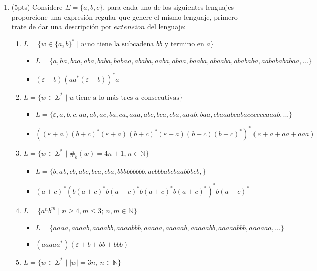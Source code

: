 \documentclass{article}
\begin{document}
\begin{enumerate}
    \item (5pts) Considere $\Sigma = \{a, b, c\}$, para cada uno de los siguientes lenguajes proporcione una expresión regular que genere el mismo lenguaje, primero trate de dar una descripción por $extension$ del lenguaje:
    \begin{enumerate}[label=\alph*)] %
        \item $L = \{w \in \{a,b\}^* \mid w~ \mbox{no tiene la subcadena $bb$ y termino en $a$}\}$
        \begin{itemize}
            \item $L =\{a, ba, baa, aba, baba, babaa, ababa, aaba, abaa, baaba, abaaba, abababa, aababababaa, ...\}$
            \item $(\varepsilon + b)(aa^*(\varepsilon + b))^*a$
        \end{itemize}
        \item $L = \{w \in \Sigma^* \mid w~ \mbox{tiene a lo m\'as tres $a$ consecutivas}\}$
        \begin{itemize}
            \item $L = \{\varepsilon, a, b, c, aa, ab, ac, ba, ca, aaa, abc, bca, cba, aaab, baa, cbaaabcabaccccccaaab, ...\}$
            \item $((\varepsilon + a)(b + c)^*(\varepsilon + a)(b + c)^*(\varepsilon + a)(b + c)(b + c)^*)^*(\varepsilon + a + aa + aaa)$
        \end{itemize}
        \item $L = \{w \in \Sigma^* \mid \#_b(w) = 4n + 1, n \in \mathbb{N} \}$
        \begin{itemize}
            \item $L = \{b, ab, cb, abc, bca, cba, bbbbbbbbb, acbbbabcbaabbbcb, \}$
            \item $(a + c)^*(b(a + c)^*b(a+c)^*b(a + c)^*b(a + c)^*)^*b(a + c)^*$ 
        \end{itemize}
        \item $L = \{a^nb^m \mid n \ge 4, m \le 3; ~n,m \in \mathbb{N} \}$
        \begin{itemize}
            \item $L = \{aaaa, aaaab, aaaabb, aaaabbb, aaaaa, aaaaab, aaaaabb, aaaaabbb, aaaaaa, ...\}$
            \item $(aaaaa^*)(\varepsilon + b +bb+bbb)$
        \end{itemize}
        \item $L = \{w \in \Sigma^* \mid |w| = 3n, ~ n \in \mathbb{N}\}$
        \begin{itemize}

\end{itemize}
\end{enumerate}
\end{enumerate}
\end{document}
